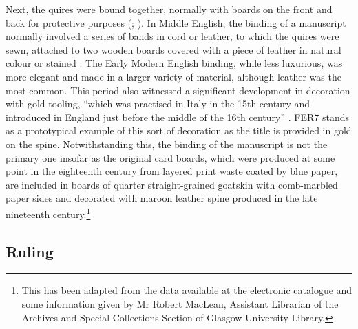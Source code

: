 \documentclass{article}
\begin{document}
Next, the quires were bound together, normally with boards on the front
and back for protective purposes (\cite[310]{johnston_writing_1944}; \cite[159]{mathisen_palaeography_2008}). In Middle English, the binding of a manuscript normally involved a
series of bands in cord or leather, to which the quires were sewn,
attached to two wooden boards covered with a piece of leather in natural
colour or stained \citep[44]{derolez_palaeography_2003}. The Early Modern English binding,
while less luxurious, was more elegant and made in a larger variety of
material, although leather was the most common. This period also witnessed
a significant development in decoration with gold tooling, ``which was
practised in Italy in the 15th century and introduced in England just
before the middle of the 16th century'' \citep[7]{petti_english_1977}. FER7 stands as
a prototypical example of this sort of decoration as the title is
provided in gold on the spine. Notwithstanding this, the binding of the
manuscript is not the primary one insofar as the original card boards,
which were produced at some point in the eighteenth century from layered
print waste coated by blue paper, are included in boards of quarter
straight-grained goatskin with comb-marbled paper sides and decorated with maroon leather spine produced in the late nineteenth
century.\footnote{This has been adapted from the data available at the
  electronic catalogue and some information given by Mr Robert MacLean,
  Assistant Librarian of the Archives and Special Collections Section of
  Glasgow University Library.}



\subsection{Ruling}
\end{document}
